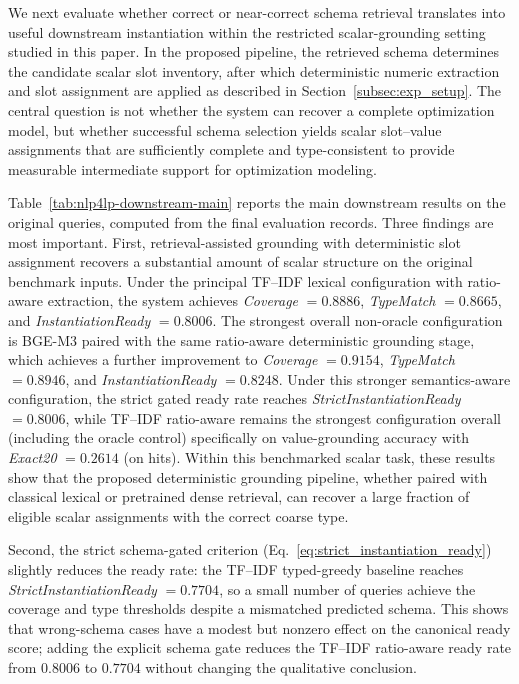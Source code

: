 \documentclass[3p]{elsarticle}
\begin{document}
We next evaluate whether correct or near-correct schema retrieval translates into useful downstream instantiation within the restricted scalar-grounding setting studied in this paper. In the proposed pipeline, the retrieved schema determines the candidate scalar slot inventory, after which deterministic numeric extraction and slot assignment are applied as described in Section~\ref{subsec:exp_setup}. The central question is not whether the system can recover a complete optimization model, but whether successful schema selection yields scalar slot--value assignments that are sufficiently complete and type-consistent to provide measurable intermediate support for optimization modeling.

Table~\ref{tab:nlp4lp-downstream-main} reports the main downstream results on the original queries, computed from the final evaluation records. Three findings are most important. First, retrieval-assisted grounding with deterministic slot assignment recovers a substantial amount of scalar structure on the original benchmark inputs. Under the principal TF--IDF lexical configuration with ratio-aware extraction, the system achieves \textit{Coverage} $=0.8886$, \textit{TypeMatch} $=0.8665$, and \textit{InstantiationReady} $=0.8006$. The strongest overall non-oracle configuration is BGE-M3 paired with the same ratio-aware deterministic grounding stage, which achieves a further improvement to \textit{Coverage} $=0.9154$, \textit{TypeMatch} $=0.8946$, and \textit{InstantiationReady} $=0.8248$. Under this stronger semantics-aware configuration, the strict gated ready rate reaches \textit{StrictInstantiationReady} $=0.8006$, while TF--IDF ratio-aware remains the strongest configuration overall (including the oracle control) specifically on value-grounding accuracy with \textit{Exact20} $=0.2614$ (on hits). Within this benchmarked scalar task, these results show that the proposed deterministic grounding pipeline, whether paired with classical lexical or pretrained dense retrieval, can recover a large fraction of eligible scalar assignments with the correct coarse type.

Second, the strict schema-gated criterion (Eq.~\eqref{eq:strict_instantiation_ready}) slightly reduces the ready rate: the TF--IDF typed-greedy baseline reaches \textit{StrictInstantiationReady} $=0.7704$, so a small number of queries achieve the coverage and type thresholds despite a mismatched predicted schema. This shows that wrong-schema cases have a modest but nonzero effect on the canonical ready score; adding the explicit schema gate reduces the TF--IDF ratio-aware ready rate from $0.8006$ to $0.7704$ without changing the qualitative conclusion.
\end{document}
